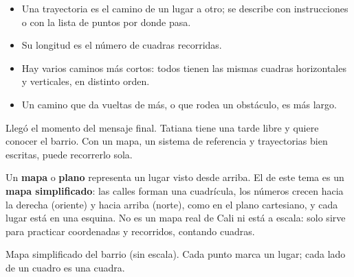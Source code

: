 \documentclass[11pt]{article}
\newcommand{\ejes}[2]{%
  \draw[gray!45] (0,0) grid (#1,#2);
  \draw[->, thick] (0,0) -- (#1+0.5,0) node[right, font=\small] {$x$};
  \draw[->, thick] (0,0) -- (0,#2+0.5) node[above, font=\small] {$y$};
  \foreach \i in {1,...,#1}
    \node[below, font=\scriptsize, text height=1.5ex, text depth=0.25ex] at (\i,0) {\i};
  \foreach \j in {1,...,#2} \node[left, font=\scriptsize] at (0,\j) {\j};
  \node[below left, font=\scriptsize] at (0,0) {0};}
\newcommand{\rosa}[1]{%
  \begin{scope}[shift={(#1)}, font=\scriptsize]
    \draw[->] (0,0) -- (0,0.6) node[above] {N};
    \draw (0,0) -- (0,-0.6) node[below] {S};
    \draw (0,0) -- (0.6,0) node[right] {E};
    \draw (0,0) -- (-0.6,0) node[left] {O};
  \end{scope}}
\begin{document}
\begin{resumen}
\begin{itemize}
  \item Una trayectoria es el camino de un lugar a otro; se describe con instrucciones o con
        la lista de puntos por donde pasa.
  \item Su longitud es el número de cuadras recorridas.
  \item Hay varios caminos más cortos: todos tienen las mismas cuadras horizontales y
        verticales, en distinto orden.
  \item Un camino que da vueltas de más, o que rodea un obstáculo, es más largo.
\end{itemize}
\end{resumen}

\label{tema:mapas}

\begin{hilo}
Llegó el momento del mensaje final. Tatiana tiene una tarde libre y quiere conocer el barrio.
Con un mapa, un sistema de referencia y trayectorias bien escritas, puede recorrerlo sola.
\end{hilo}

Un \textbf{mapa} o \textbf{plano} representa un lugar visto desde arriba. El de este tema es un
\textbf{mapa simplificado}: las calles forman una cuadrícula, los números crecen hacia la
derecha (oriente) y hacia arriba (norte), como en el plano cartesiano, y cada lugar está en una
esquina. No es un mapa real de Cali ni está a escala: solo sirve para practicar coordenadas y
recorridos, contando cuadras.

\begin{center}
\begin{minipage}{\linewidth}
\centering
{}

\vspace{1mm}
{\footnotesize Mapa simplificado del barrio (sin escala). Cada punto marca un lugar; cada lado
de un cuadro es una cuadra.}
\end{minipage}
\end{center}
\end{document}
